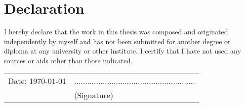 \chapter{Declaration}

\thispagestyle{empty}
\begin{center}
	\vspace*{5em}
	
\end{center}
\vspace{2em}
I hereby declare that the work in this thesis was composed and originated independently by myself and has not been submitted for another degree or diploma at any university or other institute. I certify that I have not used any sources or aids other than those indicated.

\vspace{4em}
\begin{minipage}{\linewidth}
	\begin{tabular}{p{15em}p{15em}}
		Date: \today &  .......................................................\\
		& \centering (Signature)\\
	\end{tabular}
\end{minipage}